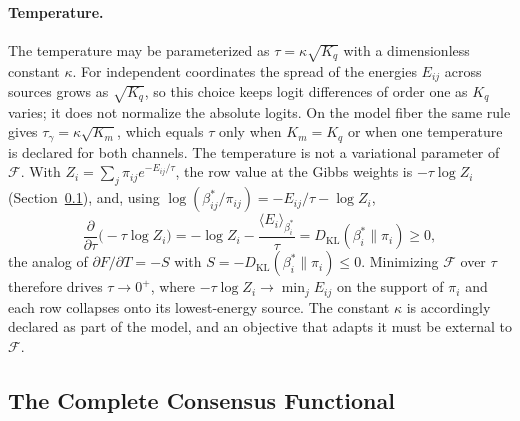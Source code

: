 \paragraph{Temperature.} The temperature may be parameterized as $\tau = \kappa\sqrt{K_q}$ with a dimensionless constant $\kappa$. For independent coordinates the spread of the energies $E_{ij}$ across sources grows as $\sqrt{K_q}$, so this choice keeps logit differences of order one as $K_q$ varies; it does not normalize the absolute logits. On the model fiber the same rule gives $\tau_\gamma = \kappa\sqrt{K_m}$, which equals $\tau$ only when $K_m = K_q$ or when one temperature is declared for both channels. The temperature is not a variational parameter of $\mathcal{F}$. With $Z_i = \sum_j \pi_{ij} e^{-E_{ij}/\tau}$, the row value at the Gibbs weights is $-\tau \log Z_i$ (Section~\ref{sec:complete_free_energy}), and, using $\log(\beta^*_{ij}/\pi_{ij}) = -E_{ij}/\tau - \log Z_i$,
\begin{equation}
\frac{\partial}{\partial \tau}\big(-\tau \log Z_i\big) = -\log Z_i - \frac{\langle E_i \rangle_{\beta_i^*}}{\tau} = D_{\mathrm{KL}}(\beta_i^* \| \pi_i) \geq 0,
\end{equation}
the analog of $\partial F/\partial T = -S$ with $S = -D_{\mathrm{KL}}(\beta_i^* \| \pi_i) \leq 0$. Minimizing $\mathcal{F}$ over $\tau$ therefore drives $\tau \to 0^+$, where $-\tau \log Z_i \to \min_j E_{ij}$ on the support of $\pi_i$ and each row collapses onto its lowest-energy source. The constant $\kappa$ is accordingly declared as part of the model, and an objective that adapts it must be external to $\mathcal{F}$.

\subsection{The Complete Consensus Functional}
\label{sec:complete_free_energy}

